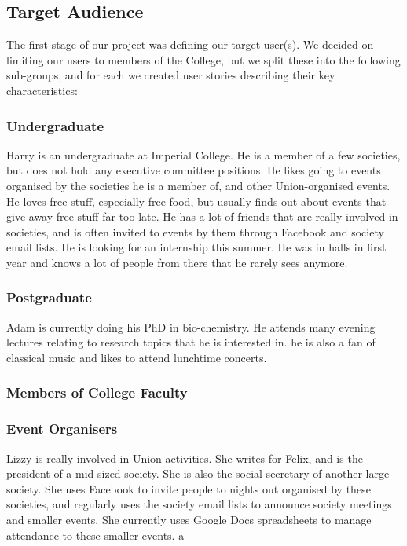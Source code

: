 \documentclass[11pt]{article}
\begin{document}
\subsection {Target Audience}

The first stage of our project was defining our target user(s). We decided on limiting our users to members of the College, but we split these into the following sub-groups, and for each we created user stories describing their key characteristics:

\subsubsection{Undergraduate}
Harry is an undergraduate at Imperial College. He is a member of a few societies, but does not hold any executive committee positions. He likes going to events organised by the societies he is a member of, and other Union-organised events. He loves free stuff, especially free food, but usually finds out about events that give away free stuff far too late. He has a lot of friends that are really involved in societies, and is often invited to events by them through Facebook and society email lists. He is looking for an internship this summer. He was in halls in first year and knows a lot of people from there that he rarely sees anymore.

\subsubsection{Postgraduate}
Adam is currently doing his PhD in bio-chemistry. He attends many evening lectures relating to research topics that he is interested in. he is also a fan of classical music and likes to attend lunchtime concerts.

\subsubsection{Members of College Faculty}
\subsubsection{Event Organisers}
Lizzy is really involved in Union activities. She writes for Felix, and is the president of a mid-sized society. She is also the social secretary of another large society. She uses Facebook to invite people to nights out organised by these societies, and regularly uses the society email lists to announce society meetings and smaller events. She currently uses Google Docs spreadsheets to manage attendance to these smaller events.
a
\end{document}

